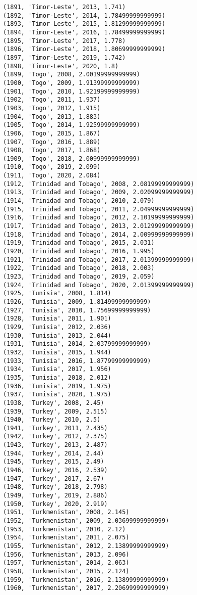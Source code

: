 \documentclass[11pt]{article}
\begin{document}
\begin{Verbatim}[commandchars=\\\{\}]
(1891, 'Timor-Leste', 2013, 1.741)
(1892, 'Timor-Leste', 2014, 1.78499999999999)
(1893, 'Timor-Leste', 2015, 1.81299999999999)
(1894, 'Timor-Leste', 2016, 1.78499999999999)
(1895, 'Timor-Leste', 2017, 1.778)
(1896, 'Timor-Leste', 2018, 1.80699999999999)
(1897, 'Timor-Leste', 2019, 1.742)
(1898, 'Timor-Leste', 2020, 1.8)
(1899, 'Togo', 2008, 2.00199999999999)
(1900, 'Togo', 2009, 1.91399999999999)
(1901, 'Togo', 2010, 1.92199999999999)
(1902, 'Togo', 2011, 1.937)
(1903, 'Togo', 2012, 1.915)
(1904, 'Togo', 2013, 1.883)
(1905, 'Togo', 2014, 1.92599999999999)
(1906, 'Togo', 2015, 1.867)
(1907, 'Togo', 2016, 1.889)
(1908, 'Togo', 2017, 1.868)
(1909, 'Togo', 2018, 2.00999999999999)
(1910, 'Togo', 2019, 2.099)
(1911, 'Togo', 2020, 2.084)
(1912, 'Trinidad and Tobago', 2008, 2.08199999999999)
(1913, 'Trinidad and Tobago', 2009, 2.02099999999999)
(1914, 'Trinidad and Tobago', 2010, 2.079)
(1915, 'Trinidad and Tobago', 2011, 2.04999999999999)
(1916, 'Trinidad and Tobago', 2012, 2.10199999999999)
(1917, 'Trinidad and Tobago', 2013, 2.01299999999999)
(1918, 'Trinidad and Tobago', 2014, 2.00999999999999)
(1919, 'Trinidad and Tobago', 2015, 2.031)
(1920, 'Trinidad and Tobago', 2016, 1.995)
(1921, 'Trinidad and Tobago', 2017, 2.01399999999999)
(1922, 'Trinidad and Tobago', 2018, 2.003)
(1923, 'Trinidad and Tobago', 2019, 2.059)
(1924, 'Trinidad and Tobago', 2020, 2.01399999999999)
(1925, 'Tunisia', 2008, 1.814)
(1926, 'Tunisia', 2009, 1.81499999999999)
(1927, 'Tunisia', 2010, 1.75699999999999)
(1928, 'Tunisia', 2011, 1.901)
(1929, 'Tunisia', 2012, 2.036)
(1930, 'Tunisia', 2013, 2.044)
(1931, 'Tunisia', 2014, 2.03799999999999)
(1932, 'Tunisia', 2015, 1.944)
(1933, 'Tunisia', 2016, 1.87799999999999)
(1934, 'Tunisia', 2017, 1.956)
(1935, 'Tunisia', 2018, 2.012)
(1936, 'Tunisia', 2019, 1.975)
(1937, 'Tunisia', 2020, 1.975)
(1938, 'Turkey', 2008, 2.45)
(1939, 'Turkey', 2009, 2.515)
(1940, 'Turkey', 2010, 2.5)
(1941, 'Turkey', 2011, 2.435)
(1942, 'Turkey', 2012, 2.375)
(1943, 'Turkey', 2013, 2.487)
(1944, 'Turkey', 2014, 2.44)
(1945, 'Turkey', 2015, 2.49)
(1946, 'Turkey', 2016, 2.539)
(1947, 'Turkey', 2017, 2.67)
(1948, 'Turkey', 2018, 2.798)
(1949, 'Turkey', 2019, 2.886)
(1950, 'Turkey', 2020, 2.919)
(1951, 'Turkmenistan', 2008, 2.145)
(1952, 'Turkmenistan', 2009, 2.03699999999999)
(1953, 'Turkmenistan', 2010, 2.12)
(1954, 'Turkmenistan', 2011, 2.075)
(1955, 'Turkmenistan', 2012, 2.13899999999999)
(1956, 'Turkmenistan', 2013, 2.096)
(1957, 'Turkmenistan', 2014, 2.063)
(1958, 'Turkmenistan', 2015, 2.124)
(1959, 'Turkmenistan', 2016, 2.13899999999999)
(1960, 'Turkmenistan', 2017, 2.20699999999999)

\end{Verbatim}
\end{document}
